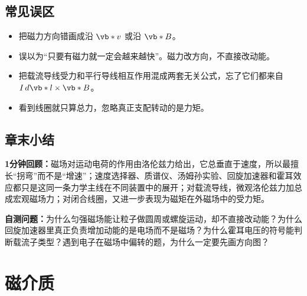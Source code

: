 \documentclass[lang=cn,11pt]{elegantbook}
\newcommand{\summaryline}[1]{\par\noindent\textbf{1分钟回顾：}#1\par}
\newcommand{\chapterselfcheck}[1]{\par\noindent\textbf{自测问题：}#1\par}
\begin{document}
\section{常见误区}

\begin{itemize}
 \item 把磁力方向错画成沿 \(\vb*{v}\) 或沿 \(\vb*{B}\)。
 \item 误以为“只要有磁力就一定会越来越快”。磁力改方向，不直接改动能。
 \item 把载流导线受力和平行导线相互作用混成两套无关公式，忘了它们都来自 \(I\,d\vb*{l}\times \vb*{B}\)。
 \item 看到线圈就只算总力，忽略真正支配转动的是力矩。
\end{itemize}

\section{章末小结}

\summaryline{磁场对运动电荷的作用由洛伦兹力给出，它总垂直于速度，所以最擅长“拐弯”而不是“增速”；速度选择器、质谱仪、汤姆孙实验、回旋加速器和霍耳效应都只是这同一条力学主线在不同装置中的展开；对载流导线，微观洛伦兹力加总成宏观磁场力；对闭合线圈，又进一步表现为磁矩在外磁场中的受力矩。}
\chapterselfcheck{为什么匀强磁场能让粒子做圆周或螺旋运动，却不直接改动能？为什么回旋加速器里真正负责增加动能的是电场而不是磁场？为什么霍耳电压的符号能判断载流子类型？遇到电子在磁场中偏转的题，为什么一定要先画方向图？}

\chapter{磁介质}
\end{document}
